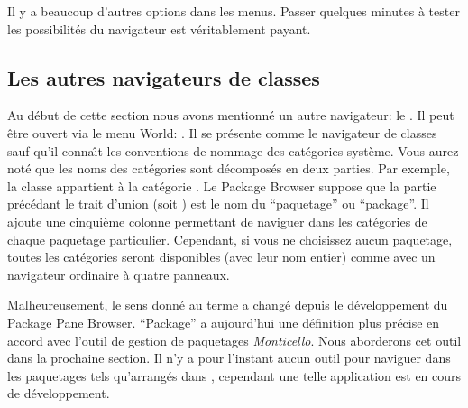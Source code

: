 \documentclass[a4paper,10pt,twoside]{book}
\begin{document}
Il y a beaucoup d'autres options dans les menus.  Passer quelques
minutes \`a tester les possibilit\'es du navigateur est v\'eritablement payant.  


\subsection{Les autres navigateurs de classes}
\label{sec:otherBrowsers}

Au d\'ebut de cette section nous avons mentionn\'e un autre navigateur:
le . 
Il peut \^etre ouvert via le menu World: .
Il se pr\'esente comme le navigateur de classes sauf qu'il conna\^{\i}t
les conventions de nommage des cat\'egories-syst\`eme.
Vous aurez not\'e que les noms des cat\'egories sont d\'ecompos\'es en deux
parties.
Par exemple, la classe  appartient \`a la cat\'egorie
.
\label{sec:package-names}
Le Package Browser suppose que la partie pr\'ec\'edant le trait d'union
(soit ) est le nom du ``paquetage'' ou ``package''. 
Il ajoute une cinqui\`eme
colonne permettant de naviguer dans les cat\'egories de chaque paquetage particulier. Cependant, si vous ne choisissez aucun paquetage, toutes les cat\'egories
seront disponibles 
(avec leur nom entier)
comme avec un navigateur ordinaire \`a quatre panneaux.

Malheureusement, le sens donn\'e au terme  a chang\'e depuis
le d\'eveloppement du Package Pane Browser. ``Package'' a aujourd'hui
une d\'efinition plus pr\'ecise en accord avec l'outil de gestion
de paquetages \emph{Monticello}. Nous aborderons cet outil dans la
prochaine section.  Il n'y a pour l'instant aucun outil pour naviguer
dans les paquetages tels qu'arrang\'es dans , cependant
une telle application est en cours de d\'eveloppement.
\end{document}
